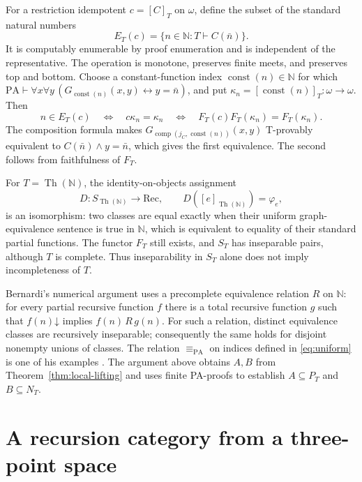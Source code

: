 \documentclass[11pt]{article}
\newcommand{\N}{\mathbb N}
\newcommand{\PA}{\mathrm{PA}}
\begin{document}
For a restriction idempotent
$c=[C]_T$ on $\omega$, define the subset of the standard natural numbers
\begin{equation}\label{eq:observation}
 E_T(c)=\{n\in\N:T\vdash C(\bar n)\}.
\end{equation}
It is computably enumerable by proof enumeration and is independent of
the representative. The operation is monotone, preserves finite meets,
and preserves top and bottom. Choose a constant-function index
$\operatorname{const}(n)\in\N$ for which
$\PA\vdash\forall x\forall y\,
(G_{\operatorname{const}(n)}(x,y)\leftrightarrow y=\bar n)$, and put
$\kappa_n=[\operatorname{const}(n)]_T:\omega\to\omega$. Then
\begin{equation}\label{eq:faithful-observation}
 n\in E_T(c)
 \quad\Longleftrightarrow\quad c\kappa_n=\kappa_n
 \quad\Longleftrightarrow\quad
 F_T(c)F_T(\kappa_n)=F_T(\kappa_n).
\end{equation}
The composition formula makes
$G_{\operatorname{comp}(j_C,\operatorname{const}(n))}(x,y)$
T-provably equivalent to $C(\bar n)\land y=\bar n$, which gives
the first equivalence.
The second follows from faithfulness of $F_T$.


For $T=\operatorname{Th}(\N)$, the identity-on-objects assignment
\[
 D:S_{\operatorname{Th}(\N)}\longrightarrow\mathrm{Rec},\qquad
 D([e]_{\operatorname{Th}(\N)})=\varphi_e,
\]
is an isomorphism: two classes are equal exactly when their uniform
graph-equivalence sentence is true in $\N$, which is equivalent
to equality of their standard partial functions.
The functor $F_T$ still exists, and $S_T$ has inseparable pairs,
although $T$ is complete.
Thus inseparability in $S_T$ alone does not imply incompleteness of $T$.

Bernardi's numerical argument uses a precomplete equivalence
relation $R$ on $\N$: for every partial recursive function $f$
there is a total recursive function $g$ such that
$f(n)\mathord\downarrow$ implies $f(n)\,R\,g(n)$.
For such a relation, distinct equivalence classes are recursively
inseparable; consequently the same holds for disjoint nonempty
unions of classes. The relation $\equiv_{\PA}$ on indices defined
in \eqref{eq:uniform} is one of his examples
\cite[pp.~125--126]{Bernardi}.
The argument above obtains $A,B$ from
Theorem~\ref{thm:local-lifting} and uses finite PA-proofs to
establish $A\subseteq P_T$ and $B\subseteq N_T$.

\section{A recursion category from a three-point space}\label{sec:cosheaves}
\end{document}
